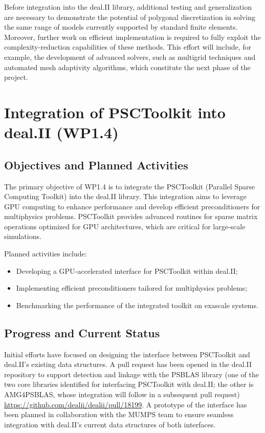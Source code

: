 \documentclass[a4paper,12pt]{article}
\begin{document}
Before integration into the deal.II library, additional testing and generalization are necessary to demonstrate the potential of polygonal discretization in solving the same range of models currently supported by standard finite elements. Moreover, further work on efficient implementation is required to fully exploit the complexity-reduction capabilities of these methods. This effort will include, for example, the development of advanced solvers, such as multigrid techniques and automated mesh adaptivity algorithms, which constitute the next phase of the project.


\section{Integration of PSCToolkit into deal.II (WP1.4)}
    \subsection{Objectives and Planned Activities}
        The primary objective of WP1.4 is to integrate the PSCToolkit (Parallel Sparse Computing Toolkit) into the deal.II library. This integration aims to leverage GPU computing to enhance performance and develop efficient preconditioners for multiphysics problems. PSCToolkit provides advanced routines for sparse matrix operations optimized for GPU architectures, which are critical for large-scale simulations.

        Planned activities include:
        \begin{itemize}
            \item Developing a GPU-accelerated interface for PSCToolkit within deal.II;
            \item Implementing efficient preconditioners tailored for multiphysics problems;
            \item Benchmarking the performance of the integrated toolkit on exascale systems.
        \end{itemize}

        \subsection{Progress and Current Status}
        Initial efforts have focused on designing the interface between PSCToolkit and deal.II's existing data structures. A pull request has been opened in the deal.II repository to support detection and linkage with the PSBLAS library (one of the two core libraries identified for interfacing PSCToolkit with deal.II; the other is AMG4PSBLAS, whose integration will follow in a subsequent pull request) \url{https://github.com/dealii/dealii/pull/18199}. A prototype of the interface has been planned in collaboration with the MUMPS team to ensure seamless integration with deal.II's current data structures of both interfaces.
\end{document}
